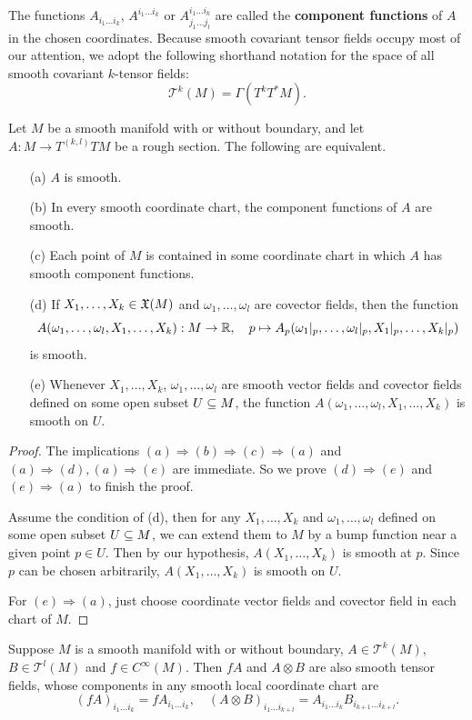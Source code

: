 The functions $A_{i_1\dots i_k}$, $A^{i_1\dots i_k}$ or $A^{i_1\dots i_k}_{j_1\dots j_l}$ are called the \textbf{component functions} of $A$ in the chosen coordinates. Because smooth covariant tensor fields occupy most of our attention, we adopt the following shorthand notation for the space of all smooth
covariant $k$-tensor fields:
\[\mathcal{T}^k(M)=\Gamma(T^kT^*M).\]
\begin{proposition}\label{tensor field smooth crit}
Let $M$ be a smooth manifold with or without boundary, and let 
$A:M\to T^{(k,l)}TM$ be a rough section. The following are equivalent.
\begin{itemize}
\item[(a)] $A$ is smooth.
\item[(b)] In every smooth coordinate chart, the component functions of $A$ are 
smooth.
\item[(c)] Each point of $M$ is contained in some coordinate chart in which $A$ 
has smooth component functions.
\item[(d)] If $X_1,\dots,X_k\in\mathfrak{X}(M)$ and $\omega_1,\dots,\omega_l$ are covector 
fields, then the function
\[A(\omega_1,\dots,\omega_l,X_1,\dots,X_k):M\to\mathbb{R},\quad p\mapsto A_p(\omega_1|_p,\dots,\omega_l|_p,X_1|_p,\dots,X_k|_p)\]
is smooth.
\item[(e)] Whenever $X_1,\dots,X_k$, $\omega_1,\dots,\omega_l$ are smooth vector 
fields and covector fields defined on some open subset $U\subseteq M$, the function 
$A(\omega_1,\dots,\omega_l,X_1,\dots,X_k)$ is smooth on $U$.
\end{itemize}
\end{proposition}
\begin{proof}
The implications $(a)\Rightarrow(b)\Rightarrow(c)\Rightarrow(a)$ and $(a)\Rightarrow(d),(a)\Rightarrow(e)$ are immediate. So we prove $(d)\Rightarrow(e)$ and $(e)\Rightarrow(a)$ to finish the proof.\par
Assume the condition of (d), then for any $X_1,\dots,X_k$ and $\omega_1,\dots,\omega_l$ defined on some open subset $U\subseteq M$, we can extend them to $M$ by a bump function near a given point $p\in U$. Then by our hypothesis, $A(X_1,\dots,X_k)$ is smooth at $p$. Since $p$ can be chosen arbitrarily, $A(X_1,\dots,X_k)$ is smooth on $U$.\par
For $(e)\Rightarrow(a)$, just choose coordinate vector fields and covector field in each chart of $M$.
\end{proof}
\begin{proposition}
Suppose $M$ is a smooth manifold with or without boundary, $A\in\mathcal{T}^k(M)$, $B\in\mathcal{T}^l(M)$ and $f\in C^\infty(M)$. Then $fA$ and $A\otimes B$ are also smooth tensor fields, whose components in any smooth local coordinate chart are
\[(fA)_{i_1\dots i_k}=fA_{i_1\dots i_k},\quad (A\otimes B)_{i_1\dots i_{k+l}}=A_{i_1\dots i_k}B_{i_{k+1}\dots i_{k+l}}.\]
\end{proposition}
